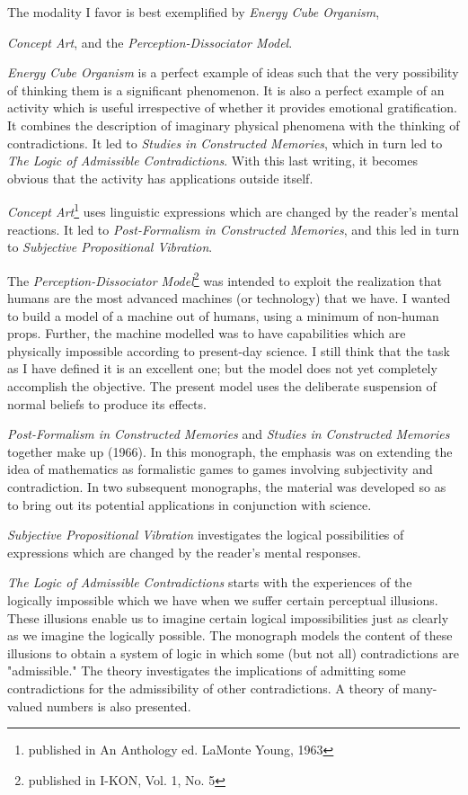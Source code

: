 \documentclass[10pt,twoside,draft]{memoir}
\newcommand{\essaytitle}[1]{
	\emph{#1}}
\begin{document}
The modality I favor is best exemplified by \essaytitle{Energy Cube Organism},
\essaytitle{Concept Art}, and the \essaytitle{Perception-Dissociator Model}. 
\essaytitle{Energy Cube Organism} is a perfect example of ideas such that the very 
possibility of thinking them is a significant phenomenon. It is also a perfect example of an 
activity which is useful irrespective of whether it provides emotional 
gratification. It combines the description of imaginary physical phenomena 
with the thinking of contradictions. It led to \essaytitle{Studies in Constructed 
Memories}, which in turn led to \essaytitle{The Logic of Admissible Contradictions}.
With this last writing, it becomes obvious that the activity has applications 
outside itself. 

\essaytitle{Concept Art}\footnote{published in An Anthology ed. LaMonte Young, 1963}
uses linguistic expressions which are changed by the reader's mental 
reactions. It led to \essaytitle{Post-Formalism in Constructed Memories}, and this led 
in turn to \essaytitle{Subjective Propositional Vibration}.

The \essaytitle{Perception-Dissociator Model}\footnote{published in I-KON, Vol. 1, No. 5} 
was intended to exploit the realization that humans are the most 
advanced machines (or technology) that we have. I wanted to build a model 
of a machine out of humans, using a minimum of non-human props. Further, 
the machine modelled was to have capabilities which are physically 
impossible according to present-day science. I still think that the task as I 
have defined it is an excellent one; but the model does not yet completely 
accomplish the objective. The present model uses the deliberate suspension 
of normal beliefs to produce its effects. 

\essaytitle{Post-Formalism in Constructed Memories} and \essaytitle{Studies in 
Constructed Memories} together make up  (1966). In 
this monograph, the emphasis was on extending the idea of mathematics as 
formalistic games to games involving subjectivity and contradiction. In two 
subsequent monographs, the material was developed so as to bring out its 
potential applications in conjunction with science. 
\essaytitle{Subjective Propositional Vibration} investigates the logical 
possibilities of expressions which are changed by the reader's mental responses.
\essaytitle{The Logic of Admissible Contradictions} starts with the experiences 
of the logically impossible which 
we have when we suffer certain perceptual illusions. These illusions enable us 
to imagine certain logical impossibilities just as clearly as we imagine the 
logically possible. The monograph models the content of these illusions to 
obtain a system of logic in which some (but not all) contradictions are 
"admissible." The theory investigates the implications of admitting some 
contradictions for the admissibility of other contradictions. A theory of 
many-valued numbers is also presented. 
\end{document}
